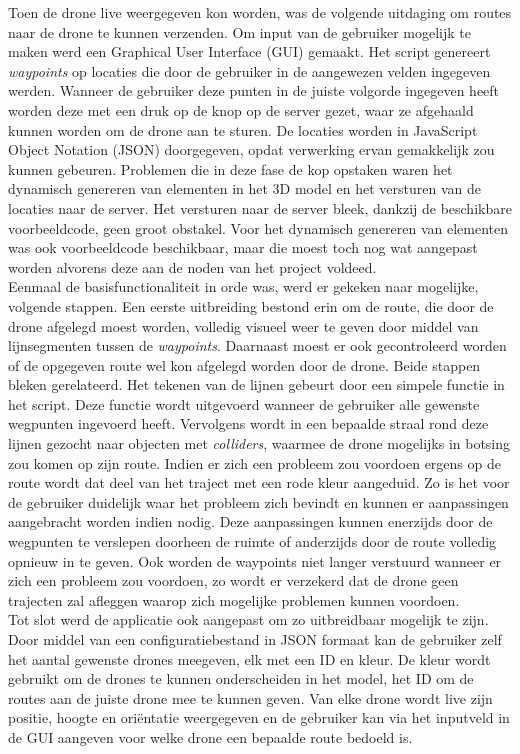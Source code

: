Toen de drone live weergegeven kon worden, was de volgende uitdaging om routes naar de drone te kunnen verzenden.
Om input van de gebruiker mogelijk te maken werd een Graphical User Interface (GUI) gemaakt.
Het script genereert \textit{waypoints} op locaties die door de gebruiker in de aangewezen velden ingegeven werden.
Wanneer de gebruiker deze punten in de juiste volgorde ingegeven heeft worden deze met een druk op de knop op de server gezet, waar ze afgehaald kunnen worden om de drone aan te sturen.
De locaties worden in JavaScript Object Notation (JSON) doorgegeven, opdat verwerking ervan gemakkelijk zou kunnen gebeuren.
Problemen die in deze fase de kop opstaken waren het dynamisch genereren van elementen in het 3D model en het versturen van de locaties naar de server.
Het versturen naar de server bleek, dankzij de beschikbare voorbeeldcode, geen groot obstakel.
Voor het dynamisch genereren van elementen was ook voorbeeldcode beschikbaar, maar die moest toch nog wat aangepast worden alvorens deze aan de noden van het project voldeed.\\

Eenmaal de basisfunctionaliteit in orde was, werd er gekeken naar mogelijke, volgende stappen.
Een eerste uitbreiding bestond erin om de route, die door de drone afgelegd moest worden, volledig visueel weer te geven door middel van lijnsegmenten tussen de \textit{waypoints}.
Daarnaast moest er ook gecontroleerd worden of de opgegeven route wel kon afgelegd worden door de drone.
Beide stappen bleken gerelateerd.
Het tekenen van de lijnen gebeurt door een simpele functie in het script.
Deze functie wordt uitgevoerd wanneer de gebruiker alle gewenste wegpunten ingevoerd heeft.
Vervolgens wordt in een bepaalde straal rond deze lijnen gezocht naar objecten met \textit{colliders}, waarmee de drone mogelijks in botsing zou komen op zijn route.
Indien er zich een probleem zou voordoen ergens op de route wordt dat deel van het traject met een rode kleur aangeduid.
Zo is het voor de gebruiker duidelijk waar het probleem zich bevindt en kunnen er aanpassingen aangebracht worden indien nodig.
Deze aanpassingen kunnen enerzijds door de wegpunten te verslepen doorheen de ruimte of anderzijds door de route volledig opnieuw in te geven.
Ook worden de waypoints niet langer verstuurd wanneer er zich een probleem zou voordoen, zo wordt er verzekerd dat de drone geen trajecten zal afleggen waarop zich mogelijke problemen kunnen voordoen.\\

Tot slot werd de applicatie ook aangepast om zo uitbreidbaar mogelijk te zijn.
Door middel van een configuratiebestand in JSON formaat kan de gebruiker zelf het aantal gewenste drones meegeven, elk met een ID en kleur.
De kleur wordt gebruikt om de drones te kunnen onderscheiden in het model, het ID om de routes aan de juiste drone mee te kunnen geven.
Van elke drone wordt live zijn positie, hoogte en oriëntatie weergegeven en de gebruiker kan via het inputveld in de GUI aangeven voor welke drone een bepaalde route bedoeld is.